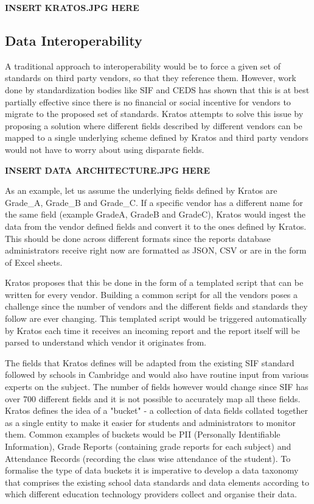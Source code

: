 \documentclass{article}
\begin{document}
\textbf{INSERT KRATOS.JPG HERE}

\subsection{Data Interoperability}
A traditional approach to interoperability would be to force a given set of standards on third party vendors, so that they reference them. However, work done by standardization bodies like SIF and CEDS has shown that this is at best partially effective since there is no financial or social incentive for vendors to migrate to the proposed set of standards. Kratos attempts to solve this issue by proposing a solution where different fields described by different vendors can be mapped to a single underlying scheme defined by Kratos and third party vendors would not have to worry about using disparate fields.

\textbf{INSERT DATA ARCHITECTURE.JPG HERE}

\bigbreak
As an example, let us assume the underlying fields defined by Kratos are Grade\_A, Grade\_B and Grade\_C. If a specific vendor has a different name for the same field (example GradeA, GradeB and GradeC), Kratos would ingest the data from the vendor defined fields and convert it to the ones defined by Kratos. This should be done across different formats since the reports database administrators receive right now are formatted as JSON, CSV or are in the form of Excel sheets.

\bigbreak
Kratos proposes that this be done in the form of a templated script that can be written for every vendor. Building a common script for all the vendors poses a challenge since the number of vendors and the different fields and standards they follow are ever changing. This templated script would be triggered automatically by Kratos each time it receives an incoming report and the report itself will be parsed to understand which vendor it originates from.

\bigbreak
The fields that Kratos defines will be adapted from the existing SIF standard followed by schools in Cambridge and would also have routine input from various experts on the subject. The number of fields however would change since SIF has over 700 different fields and it is not possible to accurately map all these fields. Kratos defines the idea of a "bucket" - a collection of data fields collated together as a single entity to make it easier for students and administrators to monitor them. Common examples of buckets would be PII (Personally Identifiable Information), Grade Reports (containing grade reports for each subject) and Attendance Records (recording the class wise attendance of the student). To formalise the type of data buckets it is imperative to develop a data taxonomy that comprises the existing school data standards and data elements according to which different education technology providers collect and organise their data. 
\end{document}
